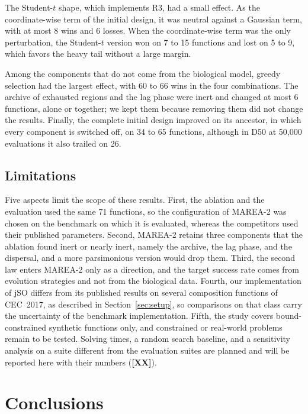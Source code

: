 \documentclass[preprint,12pt]{elsarticle}
\newcommand{\XX}{\textcolor{pending}{\textbf{[XX]}}}
\newcommand{\pend}[1]{\textcolor{pending}{#1}}
\newcommand{\XX}{[XX]}
\newcommand{\pend}[1]{#1}
\begin{document}
The Student-$t$ shape, which implements R3, had a small effect. As the
coordinate-wise term of the initial design, it was neutral against a Gaussian
term, with at most 8 wins and 6 losses. When the coordinate-wise term was the
only perturbation, the Student-$t$ version won on 7 to 15 functions and lost on
5 to 9, which favors the heavy tail without a large margin.

Among the components that do not come from the biological model, greedy
selection had the largest effect, with 60 to 66 wins in the four combinations.
The archive of exhausted regions and the lag phase were inert and changed at
most 6 functions, alone or together; we kept them because removing them did
not change the results. Finally, the complete initial design improved on its
ancestor, in which every component is switched off, on 34 to 65 functions,
although in D50 at 50,000 evaluations it also trailed on 26.

\subsection{Limitations}
\label{sec:limitations}

Five aspects limit the scope of these results. First, the ablation and the
evaluation used the same 71 functions, so the configuration of MAREA-2 was
chosen on the benchmark on which it is evaluated, whereas the competitors used
their published parameters. Second, MAREA-2 retains three components that the
ablation found inert or nearly inert, namely the archive, the lag phase, and
the dispersal, and a more parsimonious version would drop them. Third, the
second law enters MAREA-2 only as a direction, and the target success rate
comes from evolution strategies and not from the biological data. Fourth, our
implementation of jSO differs from its published results on several
composition functions of CEC~2017, as described in Section~\ref{sec:setup}, so
comparisons on that class carry the uncertainty of the benchmark
implementation. Fifth, the study covers bound-constrained synthetic functions
only, and constrained or real-world problems remain to be tested.
\pend{Solving times, a random search baseline, and a sensitivity analysis on a
suite different from the evaluation suites are planned and will be reported
here with their numbers (\XX).}

\section{Conclusions}
\label{sec:conclusions}
\end{document}

